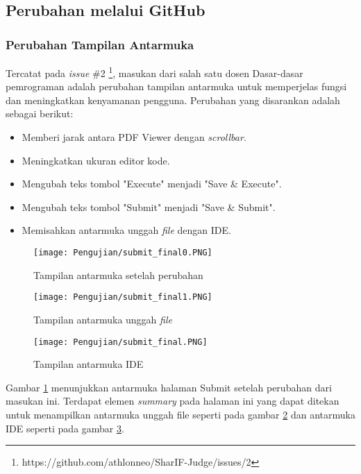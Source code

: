 \subsection{Perubahan melalui GitHub}
\label{subsec:github}

\subsubsection{Perubahan Tampilan Antarmuka}
Tercatat pada \textit{issue} \#2 \footnote{https://github.com/athlonneo/SharIF-Judge/issues/2}, masukan dari salah satu dosen Dasar-dasar pemrograman adalah perubahan tampilan antarmuka untuk memperjelas fungsi dan meningkatkan kenyamanan pengguna. Perubahan yang disarankan adalah sebagai berikut:
\begin{itemize}
    \item Memberi jarak antara PDF Viewer dengan \textit{scrollbar}.
    \item Meningkatkan ukuran editor kode.
    \item Mengubah teks tombol "Execute" menjadi "Save \& Execute".
    \item Mengubah teks tombol "Submit" menjadi "Save \& Submit".
    \item Memisahkan antarmuka unggah \textit{file} dengan IDE.
\end{itemize}

\begin{figure}[H]
	\centering  
	\texttt{[image: Pengujian/submit\_final0.PNG]}  
	\caption{Tampilan antarmuka setelah perubahan}
	\label{fig:5:submit0} 
\end{figure} 

\begin{figure}[H]
	\centering  
	\texttt{[image: Pengujian/submit\_final1.PNG]}  
	\caption{Tampilan antarmuka unggah \textit{file}}
	\label{fig:5:submit1} 
\end{figure} 

\begin{figure}[H]
	\centering  
	\texttt{[image: Pengujian/submit\_final.PNG]}  
	\caption{Tampilan antarmuka IDE}
	\label{fig:5:submit2} 
\end{figure} 

Gambar \ref{fig:5:submit0} menunjukkan antarmuka halaman Submit setelah perubahan dari masukan ini. Terdapat elemen \textit{summary} pada halaman ini yang dapat ditekan untuk menampilkan antarmuka unggah file seperti pada gambar \ref{fig:5:submit1} dan antarmuka IDE seperti pada gambar \ref{fig:5:submit2}.

